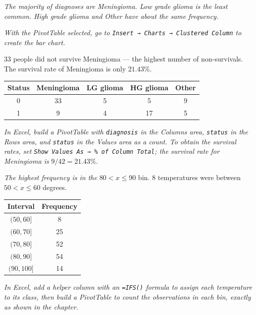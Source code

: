 \documentclass[
  11pt,
  letterpaper,
  DIV=11,
  numbers=noendperiod,
  oneside,
  open=any]{scrreprt}
\newenvironment{bsanswerkey}[2]{%
  \begin{tcolorbox}[bsbase, colback=bspaper2, colframe=bsline, fontupper=\small,
    title={\hypertarget{a-#1}{}\label{a-#1}\hyperlink{q-#1}{\textcolor{bsink2}{\MakeUppercase{#2}}}\hfill
      \hyperlink{q-#1}{\textcolor{bsaccent}{\normalfont\footnotesize back to page \pageref{q-#1}}}}]}%
  {\end{tcolorbox}}
\begin{document}
\begin{bsanswerkey}{bsans8}{Exercise 1, question 2}

\emph{The majority of diagnoses are Meningioma. Low grade glioma is the
least common. High grade glioma and Other have about the same
frequency.}

\emph{With the PivotTable selected, go to
\texttt{Insert\ →\ Charts\ →\ Clustered\ Column} to create the bar
chart.}

\end{bsanswerkey}

\begin{bsanswerkey}{bsans9}{Exercise 1, question 3}

\(33\) people did not survive Meningioma --- the highest number of
non-survivals. The survival rate of Meningioma is only \(21.43\)\%.

\begin{center}
\begin{tabular}{ccccc}
\toprule
Status & Meningioma & LG glioma & HG glioma & Other \\
\midrule
0 & 33 & 5 & 5 & 9 \\
1 & 9 & 4 & 17 & 5 \\
\bottomrule
\end{tabular}
\end{center}

\emph{In Excel, build a PivotTable with \texttt{diagnosis} in the
Columns area, \texttt{status} in the Rows area, and \texttt{status} in
the Values area as a count. To obtain the survival rates, set
\texttt{Show\ Values\ As\ →\ \%\ of\ Column\ Total}; the survival rate
for Meningioma is} \(9/42 = 21.43\)\%.

\end{bsanswerkey}

\begin{bsanswerkey}{bsans10}{Exercise 2, question 1}

\emph{The highest frequency is in the} \(80 < x \le 90\) bin. \(8\)
temperatures were between \(50 < x \le 60\) degrees.

\begin{center}
\begin{tabular}{cc}
\toprule
Interval & Frequency \\
\midrule
\((50,60]\) & 8 \\
\((60,70]\) & 25 \\
\((70,80]\) & 52 \\
\((80,90]\) & 54 \\
\((90,100]\) & 14 \\
\bottomrule
\end{tabular}
\end{center}

\emph{In Excel, add a helper column with an \texttt{=IFS()} formula to
assign each temperature to its class, then build a PivotTable to count
the observations in each bin, exactly as shown in the chapter.}

\end{bsanswerkey}
\end{document}
